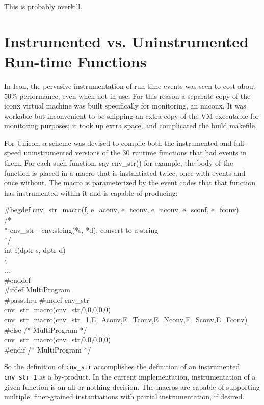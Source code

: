This is probably overkill.

\section{Instrumented vs. Uninstrumented Run-time Functions}

In Icon, the pervasive instrumentation of run-time events was seen to
cost about 50\% performance, even when not in use. For
this reason a separate copy of the iconx virtual machine was built
specifically for monitoring, an miconx.  It was workable but
inconvenient to be shipping an extra copy of the VM executable for
monitoring purposes; it took up extra space, and complicated the build
makefile.

For Unicon, a scheme was devised to compile both the instrumented and
full-speed uninstrumented versions of the 30 runtime functions that
had events in them.  For each such function, say cnv\_str() for
example, the body of the function is placed in a macro that is
instantiated twice, once with events and once without.  The macro is
parameterized by the event codes that that function has instrumented
within it and is capable of producing:

\begin{iconcode}
\#begdef cnv\_str\_macro(f, e\_aconv, e\_tconv, e\_nconv, e\_sconf, e\_fconv) \\
/* \\
 * cnv\_str - cnv:string(*s, *d), convert to a string \\
 */ \\
int f(dptr s, dptr d) \\
\>   \{ \\
\> ... \\
\> \#enddef
\ \\
\#ifdef MultiProgram \\
\#passthru \#undef cnv\_str \\
cnv\_str\_macro(cnv\_str,0,0,0,0,0) \\
cnv\_str\_macro(cnv\_str\_1,E\_Aconv,E\_Tconv,E\_Nconv,E\_Sconv,E\_Fconv) \\
\#else					/* MultiProgram */ \\
cnv\_str\_macro(cnv\_str,0,0,0,0,0) \\
\#endif					/* MultiProgram */
\end{iconcode}

So the definition of \texttt{cnv\_str} accomplishes the definition of
an instrumented \texttt{cnv\_str\_1} as a by-product.  In the current
implementation, instrumentation of a given function is an
all-or-nothing decision. The macros are capable of supporting
multiple, finer-grained instantiations with partial instrumentation,
if desired.

